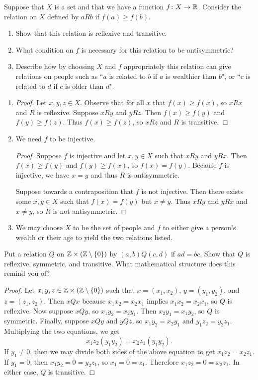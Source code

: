 \documentclass{article}
\begin{document}
  \newpage
  \begin{problem}{2}
    Suppose that $X$ is a set and that we have a function $f\colon X\to \mathbb{R}$. Consider the relation on $X$ defined by $aRb$ if $f(a) \geq f(b)$.
    \begin{enumerate}[label=(\alph*)]
      \item Show that this relation is reflexive and transitive.
      \item What condition on $f$ is necessary for this relation to be antisymmetric?
      \item Describe how by choosing $X$ and $f$ appropriately this relation can give relations on people such as ``$a$ is related to $b$ if $a$ is wealthier than $b$", or ``$c$ is related to $d$ if $c$ is older than $d$".
    \end{enumerate}
  \end{problem}
  \begin{enumerate}[label=(\alph*)]
    \item
    \begin{proof}
      Let $x, y, z\in X$. Observe that for all $x$ that $f(x) \geq f(x)$, so $xRx$ and $R$ is reflexive. Suppose $xRy$ and $yRz$. Then $f(x)\geq f(y)$ and $f(y)\geq f(z)$. Thus $f(x)\geq f(z)$, so $xRz$ and $R$ is transitive.
    \end{proof}
    \item We need $f$ to be injective.
    \begin{proof}
      Suppose $f$ is injective and let $x, y\in X$ such that $xRy$ and $yRx$. Then $f(x)\geq f(y)$ and $f(y)\geq f(x)$, so $f(x) = f(y)$. Because $f$ is injective, we have $x = y$ and thus $R$ is antisymmetric.\par
      Suppose towards a contraposition that $f$ is not injective. Then there exists some $x, y\in X$ such that $f(x) = f(y)$ but $x\neq y$. Thus $xRy$ and $yRx$ and $x\neq y$, so $R$ is not antisymmetric.
    \end{proof}
    \item We may choose $X$ to be the set of people and $f$ to either give a person's wealth or their age to yield the two relations listed.
  \end{enumerate}
  \newpage
  \begin{problem}{3}
    Put a relation $Q$ on $\mathbb{Z} \times (\mathbb{Z}\setminus \left\{0\right\})$ by $(a, b)Q(c, d)$ if $ad = bc$. Show that $Q$ is reflexive, symmetric, and transitive. What mathematical structure does this remind you of?
  \end{problem}
  \begin{proof}
    Let $x, y, z\in \mathbb{Z} \times (\mathbb{Z}\setminus \left\{0\right\})$ such that $x = (x_1, x_2)$, $y = (y_1, y_2)$, and $z = (z_1, z_2)$. Then $xQx$ because $x_1x_2 = x_2x_1$ implies $x_1x_2 = x_2x_1$, so $Q$ is reflexive. Now suppose $xQy$, so $x_1 y_2 = x_2 y_1$. Then $x_2 y_1 = x_1 y_2$, so $Q$ is symmetric. Finally, suppose $xQy$ and $yQz$, so $x_1 y_2 = x_2 y_1$ and $y_1 z_2 = y_2 z_1$. Multiplying the two equations, we get
    \[
      x_1 z_2 (y_1 y_2) = x_2 z_1 (y_1 y_2).
    \]
    If $y_1 \neq 0$, then we may divide both sides of the above equation to get $x_1 z_2 = x_2 z_1$. If $y_1 = 0$, then $x_1 y_2 = 0 = y_2 z_1$, so $x_1 = 0 = z_1$. Therefore $x_1 z_2 = 0 = x_2 z_1$. In either case, $Q$ is transitive.
  \end{proof}
\end{document}
